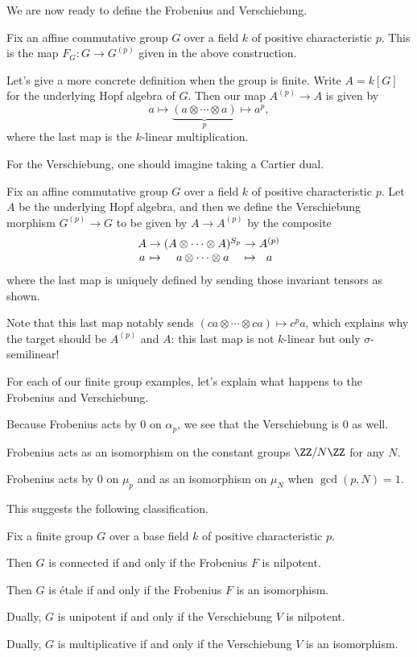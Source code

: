 \documentclass[../notes.tex]{subfiles}
\begin{document}
We are now ready to define the Frobenius and Verschiebung.
\begin{definition}[Frobenius]
	Fix an affine commutative group $G$ over a field $k$ of positive characteristic $p$. This is the map $F_G\colon G\to G^{(p)}$ given in the above construction.
\end{definition}
\begin{remark}
	Let's give a more concrete definition when the group is finite. Write $A=k[G]$ for the underlying Hopf algebra of $G$. Then our map $A^{(p)}\to A$ is given by
	\[a\mapsto\underbrace{(a\otimes\cdots\otimes a)}_p\mapsto a^p,\]
	where the last map is the $k$-linear multiplication.
\end{remark}
For the Verschiebung, one should imagine taking a Cartier dual.
\begin{definition}[Verschiebung]
	Fix an affine commutative group $G$ over a field $k$ of positive characteristic $p$. Let $A$ be the underlying Hopf algebra, and then we define the Verschiebung morphism $G^{(p)}\to G$ to be given by $A\to A^{(p)}$ by the composite
	\[\arraycolsep=1.4pt\begin{array}{ccccccc}
		A &\to& (A\otimes\cdots\otimes A)^{S_p} &\to& A^{(p)} \\
		a &\mapsto& a\otimes\cdots\otimes a &\mapsto& a
	\end{array}\]
	where the last map is uniquely defined by sending those invariant tensors as shown.
\end{definition}
\begin{remark}
	Note that this last map notably sends $(ca\otimes\cdots\otimes ca)\mapsto c^pa$, which explains why the target should be $A^{(p)}$ and $A$: this last map is not $k$-linear but only $\sigma$-semilinear!
\end{remark}
For each of our finite group examples, let's explain what happens to the Frobenius and Verschiebung.
\begin{example}
	Because Frobenius acts by $0$ on $\alpha_p$, we see that the Verschiebung is $0$ as well.
\end{example}
\begin{example}
	Frobenius acts as an isomorphism on the constant groups $\ZZ/N\ZZ$ for any $N$.
\end{example}
\begin{example}
	Frobenius acts by $0$ on $\mu_p$ and as an isomorphism on $\mu_N$ when $\gcd(p,N)=1$.
\end{example}
This suggests the following classification.
\begin{proposition}
	Fix a finite group $G$ over a base field $k$ of positive characteristic $p$.
	\begin{listalph}
		\item Then $G$ is connected if and only if the Frobenius $F$ is nilpotent.
		\item Then $G$ is \'etale if and only if the Frobenius $F$ is an isomorphism.
		\item Dually, $G$ is unipotent if and only if the Verschiebung $V$ is nilpotent.
		\item Dually, $G$ is multiplicative if and only if the Verschiebung $V$ is an isomorphism.
	\end{listalph}
\end{proposition}
\end{document}
